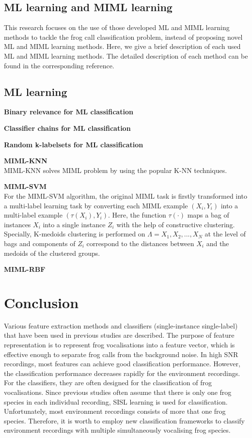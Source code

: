 \subsection{ML learning and MIML learning}

This research focuses on the use of those developed ML and MIML learning methods to tackle the frog call classification problem, instead of proposing novel ML and MIML learning methods. Here, we give a brief description of each used ML and MIML learning methods. The detailed description of each method can be found in the corresponding reference.


\subsection{ML learning}

\textbf{Binary relevance for ML classification}

\textbf{Classifier chains for ML classification}


\textbf{Random k-labelsets for ML classification}



\textbf{MIML-KNN}
\\
MIML-KNN solves MIML problem by using the popular K-NN techniques. 




\textbf{MIML-SVM}
\\
For the MIML-SVM algorithm, the original MIML task is firstly transformed into a multi-label learning task by converting each MIML example $(X_{i}, Y_{i})$ into a multi-label example $(\tau(X_{i}), Y_{i})$. Here, the function $\tau(\cdotp)$ maps a bag of instances $X_{i}$ into a single instance $Z_{i}$ with the help of constructive clustering. Specially, K-medoids clustering is performed on $\Lambda={X_{1},X_{2},...,X_{N}}$ at the level of bags and components of $Z_{i}$ correspond to the distances between $X_{i}$ and the medoids of the clustered groups. 



\textbf{MIML-RBF}




\section{Conclusion}
Various feature extraction methods and classifiers (single-instance single-label) that have been used in previous studies are described. The purpose of feature representation is to represent frog vocalisations into a feature vector, which is effective enough to separate frog calls from the background noise. In high SNR recordings, most features can achieve good classification performance. However, the classification performance decreases rapidly for the environment recordings. For the classifiers, they are often designed for the classification of frog vocalisations. Since previous studies often assume that there is only one frog species in each individual recording, SISL learning is used for classification. Unfortunately, most environment recordings consists of more that one frog species. Therefore, it is worth to employ new classification frameworks to classify environment recordings with multiple simultaneously vocalising frog species.


